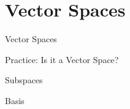 \section{Vector Spaces}

\begin{frame}{Vector Spaces}

\end{frame}

\begin{frame}{Practice: Is it a Vector Space?}

\end{frame}

\begin{frame}{Subspaces}

\end{frame}

\begin{frame}{Basis}

\end{frame}

